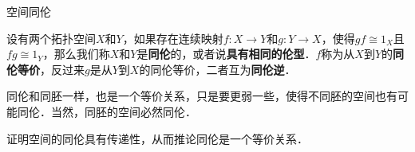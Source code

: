 \begin{definition}{空间同伦}

设有两个拓扑空间$X$和$Y$，如果存在连续映射$f:X\rightarrow Y$和$g:Y\rightarrow X$，使得$gf\cong 1_X$且$fg\cong 1_Y$，那么我们称$X$和$Y$是\textbf{同伦}的，或者说\textbf{具有相同的伦型}．$f$称为从$X$到$Y$的\textbf{同伦等价}，反过来$g$是从$Y$到$X$的同伦等价，二者互为\textbf{同伦逆}．

\end{definition}

同伦和同胚一样，也是一个等价关系，只是要更弱一些，使得不同胚的空间也有可能同伦．当然，同胚的空间必然同伦．

\begin{exercise}{}
证明空间的同伦具有传递性，从而推论同伦是一个等价关系．
\end{exercise}



